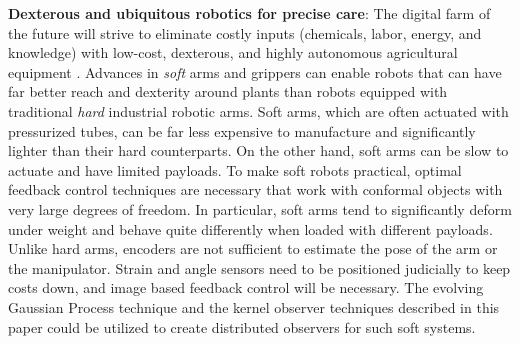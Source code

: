 
\textbf{Dexterous and ubiquitous robotics for precise care}​: The digital farm of the future will strive to eliminate costly inputs (chemicals, labor, energy, and knowledge) with low-cost, dexterous, and highly autonomous agricultural equipment \cite{pedersen2006agricultural}. Advances in \textit{soft} arms and grippers can enable robots that can have far better reach and dexterity around plants than robots equipped with traditional \textit{hard} industrial robotic arms. Soft arms, which are often actuated with pressurized tubes, can be far less expensive to manufacture and significantly lighter than their hard counterparts. On the other hand, soft arms can be slow to actuate and have limited payloads. To make soft robots practical, optimal feedback control techniques are necessary that work with conformal objects with very large degrees of freedom. In particular, soft arms tend to significantly deform under weight and behave quite differently when loaded with different payloads. Unlike hard arms, encoders are not sufficient to estimate the pose of the arm or the manipulator. Strain and angle sensors need to be positioned judicially to keep costs down, and image based feedback control will be necessary. The evolving Gaussian Process technique and the kernel observer techniques described in this paper could be utilized to create distributed observers for such soft systems.  %

